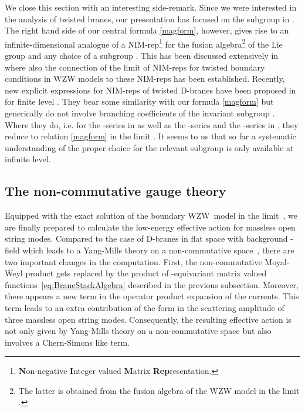 \documentclass[12pt,a4paper]{article}
\providecommand{\embin}{{\hookrightarrow}}
\def\iG{G^\omega} %
\def\tA{{\rm A}}
\begin{document}
We close this section with an interesting side-remark. Since we 
were interested in the analysis of twisted branes, our presentation 
has focused on the subgroup \myHighlight{$\iG$}\coordHE{} in \coordHE{}. The right hand side of 
our central formula \eqref{magform}, however, gives rise
to an infinite-dimensional analogue of a NIM-rep\footnote{{\bf N}on-negative
{\bf I}nteger valued {\bf M}atrix {\bf Rep}resentation.} for the fusion
algebra\footnote{The latter is obtained from the fusion algebra of the WZW
model in the limit \coordHE{}.} of the Lie group \coordHE{} and any choice
of a subgroup \myHighlight{$H \embin G$}\coordHE{}.
This has been discussed extensively in \cite{Quella:2001wh} where also
the connection of the \coordHE{} limit of NIM-reps for twisted boundary
conditions in WZW models to these NIM-reps has been established.
Recently, new explicit expressions for NIM-reps of twisted D-branes have been
proposed in \cite{Petkova:2002yj,Gaberdiel:2002qa} for finite level \coordHE{}.
They bear some similarity with our formula \eqref{magform} but generically
do not involve branching coefficients of the invariant subgroup \myHighlight{$\iG$}\coordHE{}.
Where they do, i.e. for the \coordHE{}-series in \cite{Petkova:2002yj} as well as
the \coordHE{}-series and the \coordHE{}-series in \cite{Gaberdiel:2002qa},
they reduce to relation \eqref{magform} in the limit \coordHE{}.
It seems to us that so far a systematic understanding of the proper
choice for the relevant subgroup is only available at infinite level.

\subsection{The non-commutative gauge theory}

Equipped with the exact solution of the boundary WZW~model in the
limit~\coordHE{}, we are finally prepared to calculate 
the low-energy effective action for massless open string modes. 
Compared to the case of D-branes in flat space with background 
\coordHE{}-field which leads to a Yang-Mills theory on a non-commutative 
space~\cite{Seiberg:1999vs}, there are two important changes in 
the computation. First, the non-commutative Moyal-Weyl product 
gets replaced by the product of \myHighlight{$\iG$}\coordHE{}-equivariant matrix valued 
functions~\eqref{eq:BraneStackAlgebra} described in the previous
subsection. Moreover, there appears a new term \coordHE{} in the operator product expansion of the currents. This 
term leads to an extra contribution of the form  \myHighlight{$f_{\mu\nu\sigma}
\tA^\mu\tA^\nu\tA^\sigma$}\coordHE{} in the scattering amplitude of three 
massless open string modes. Consequently, the resulting effective 
action is not only given by Yang-Mills theory on a non-commutative space 
but also involves a Chern-Simons like term.%
\smallskip%
\end{document}
